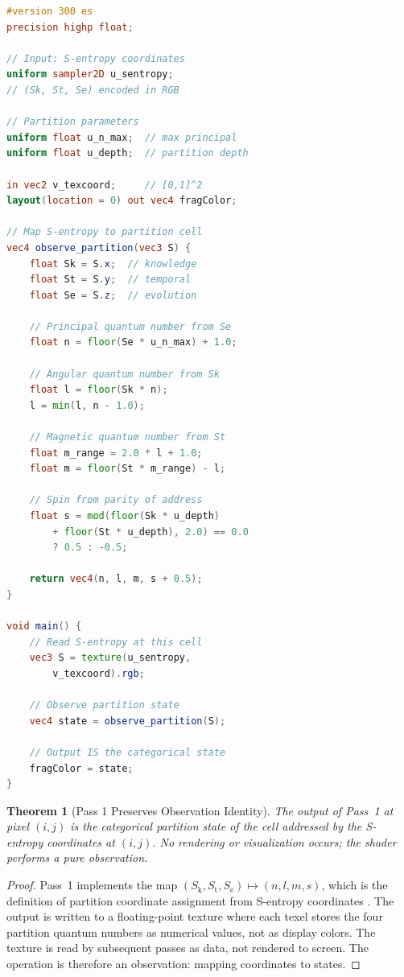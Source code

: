 \documentclass[11pt,twocolumn,a4paper]{article}
\newtheorem{theorem}{Theorem}[section]
\theoremstyle{definition}
\theoremstyle{remark}
\newcommand{\Sk}{S_{\mathrm{k}}}
\newcommand{\St}{S_{\mathrm{t}}}
\newcommand{\Se}{S_{\mathrm{e}}}
\begin{document}
\begin{lstlisting}[language=GLSL,caption={Pass 1: Partition State Observation},label=lst:pass1]
#version 300 es
precision highp float;

// Input: S-entropy coordinates
uniform sampler2D u_sentropy;
// (Sk, St, Se) encoded in RGB

// Partition parameters
uniform float u_n_max;  // max principal
uniform float u_depth;  // partition depth

in vec2 v_texcoord;     // [0,1]^2
layout(location = 0) out vec4 fragColor;

// Map S-entropy to partition cell
vec4 observe_partition(vec3 S) {
    float Sk = S.x;  // knowledge
    float St = S.y;  // temporal
    float Se = S.z;  // evolution

    // Principal quantum number from Se
    float n = floor(Se * u_n_max) + 1.0;

    // Angular quantum number from Sk
    float l = floor(Sk * n);
    l = min(l, n - 1.0);

    // Magnetic quantum number from St
    float m_range = 2.0 * l + 1.0;
    float m = floor(St * m_range) - l;

    // Spin from parity of address
    float s = mod(floor(Sk * u_depth)
        + floor(St * u_depth), 2.0) == 0.0
        ? 0.5 : -0.5;

    return vec4(n, l, m, s + 0.5);
}

void main() {
    // Read S-entropy at this cell
    vec3 S = texture(u_sentropy,
        v_texcoord).rgb;

    // Observe partition state
    vec4 state = observe_partition(S);

    // Output IS the categorical state
    fragColor = state;
}
\end{lstlisting}

\begin{theorem}[Pass 1 Preserves Observation Identity]
\label{thm:pass1_identity}
The output of Pass~1 at pixel $(i,j)$ is the categorical partition state of the cell addressed by the S-entropy coordinates at $(i,j)$. No rendering or visualization occurs; the shader performs a pure observation.
\end{theorem}

\begin{proof}
Pass~1 implements the map $(\Sk, \St, \Se) \mapsto (n, l, m, s)$, which is the definition of partition coordinate assignment from S-entropy coordinates \citep{sachikonye2025a}. The output is written to a floating-point texture where each texel stores the four partition quantum numbers as numerical values, not as display colors. The texture is read by subsequent passes as data, not rendered to screen. The operation is therefore an observation: mapping coordinates to states.
\end{proof}
\end{document}
